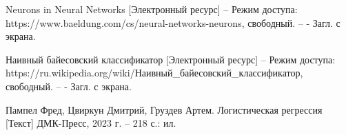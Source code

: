 \begin{references}
	\item\label{ref:neuron-model} Neurons in Neural Networks [Электронный ресурс] – Режим доступа: https://www.baeldung.com/cs/neural-networks-neurons, свободный. – - Загл. с экрана.

	\item\label{ref:nbc} Наивный байесовский классификатор [Электронный ресурс] – Режим доступа: https://ru.wikipedia.org/wiki/Наивный\_байесовский\_классификатор, свободный. – - Загл. с экрана.

	\item\label{ref:log-reg} Пампел Фред, Цвиркун Дмитрий, Груздев Артем. Логистическая регрессия [Текст] ДМК-Пресс, 2023 г. – 218 с.: ил.

	
	\label{ref:total}
\end{references}
